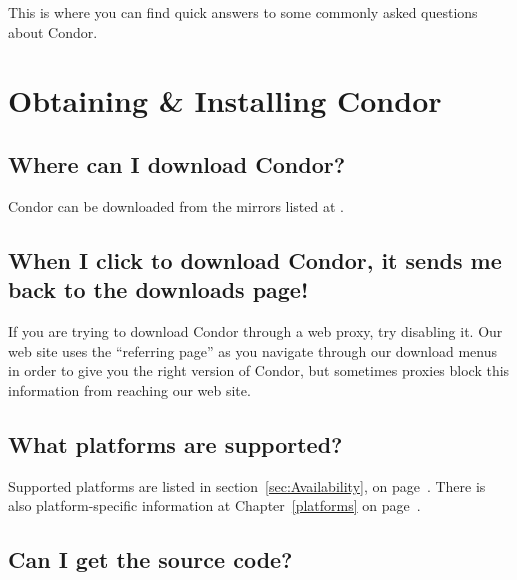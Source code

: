 

This is where you can find quick answers to some commonly asked
questions about Condor.

\section{Obtaining \& Installing Condor}

\subsection*{Where can I download Condor?}

Condor can be downloaded from the mirrors listed at
.  

\subsection*{When I click to download Condor, it sends me back to the downloads page!}

If you are trying to download Condor through a web proxy, try
disabling it.
Our web site uses the ``referring page'' as you navigate through our
download menus in order to give you the right version of Condor, but
sometimes proxies block this information from reaching our web site.

\subsection*{What platforms are supported?}

Supported platforms are listed in section~\ref{sec:Availability}, on
page~\pageref{sec:Availability}.
There is also platform-specific information at
Chapter~\ref{platforms} on page~\pageref{platforms}.

\subsection*{Can I get the source code?}

